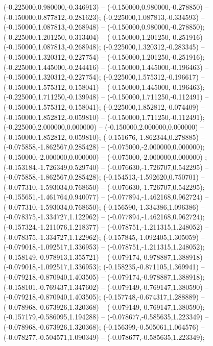  (-0.225000,0.980000,-0.346913) -- (-0.150000,0.980000,-0.278850) -- (-0.150000,0.877812,-0.281623);
 (-0.225000,1.087813,-0.334593) -- (-0.150000,1.087813,-0.268948) -- (-0.150000,0.980000,-0.278850);
 (-0.225000,1.201250,-0.313404) -- (-0.150000,1.201250,-0.251916) -- (-0.150000,1.087813,-0.268948);
 (-0.225000,1.320312,-0.283345) -- (-0.150000,1.320312,-0.227754) -- (-0.150000,1.201250,-0.251916);
 (-0.225000,1.445000,-0.244416) -- (-0.150000,1.445000,-0.196463) -- (-0.150000,1.320312,-0.227754);
 (-0.225000,1.575312,-0.196617) -- (-0.150000,1.575312,-0.158041) -- (-0.150000,1.445000,-0.196463);
 (-0.225000,1.711250,-0.139948) -- (-0.150000,1.711250,-0.112491) -- (-0.150000,1.575312,-0.158041);
 (-0.225000,1.852812,-0.074409) -- (-0.150000,1.852812,-0.059810) -- (-0.150000,1.711250,-0.112491);
 (-0.225000,2.000000,0.000000) -- (-0.150000,2.000000,0.000000) -- (-0.150000,1.852812,-0.059810);
 (-0.151676,-1.862344,0.278885) -- (-0.075858,-1.862567,0.285428) -- (-0.075000,-2.000000,0.000000);
 (-0.150000,-2.000000,0.000000) -- (-0.075000,-2.000000,0.000000) ;
 (-0.153184,-1.726349,0.529740) -- (-0.076630,-1.726707,0.542295) -- (-0.075858,-1.862567,0.285428);
 (-0.154513,-1.592620,0.750701) -- (-0.077310,-1.593034,0.768650) -- (-0.076630,-1.726707,0.542295);
 (-0.155651,-1.461764,0.940077) -- (-0.077894,-1.462168,0.962724) -- (-0.077310,-1.593034,0.768650);
 (-0.156590,-1.334386,1.096386) -- (-0.078375,-1.334727,1.122962) -- (-0.077894,-1.462168,0.962724);
 (-0.157324,-1.211076,1.218377) -- (-0.078751,-1.211315,1.248052) -- (-0.078375,-1.334727,1.122962);
 (-0.157845,-1.092405,1.305059) -- (-0.079018,-1.092517,1.336953) -- (-0.078751,-1.211315,1.248052);
 (-0.158149,-0.978913,1.355721) -- (-0.079174,-0.978887,1.388918) -- (-0.079018,-1.092517,1.336953);
 (-0.158235,-0.871105,1.369941) -- (-0.079218,-0.870940,1.403505) -- (-0.079174,-0.978887,1.388918);
 (-0.158101,-0.769437,1.347602) -- (-0.079149,-0.769147,1.380590) -- (-0.079218,-0.870940,1.403505);
 (-0.157748,-0.674317,1.288889) -- (-0.078968,-0.673926,1.320368) -- (-0.079149,-0.769147,1.380590);
 (-0.157179,-0.586095,1.194288) -- (-0.078677,-0.585635,1.223349) -- (-0.078968,-0.673926,1.320368);
 (-0.156399,-0.505061,1.064576) -- (-0.078277,-0.504571,1.090349) -- (-0.078677,-0.585635,1.223349);
